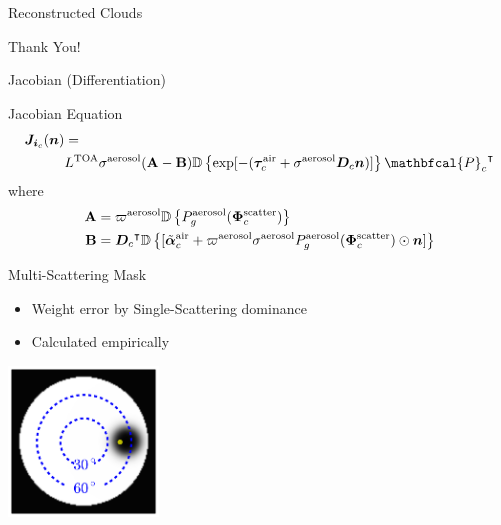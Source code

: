 \documentclass[compress,red,12pt]{beamer}
\newcommand{\vect}[1]{\bm{#1}}
\newcommand{\transpose}[1]{{#1}^\intercal}
\newcommand{\OpCamera}{\mathbfcal{P}}
\newcommand{\OpDiag}[1]{\mathbb{D}\left\{#1\right\}}
\begin{document}

\begin{frame}[label=current]{Reconstructed Clouds}
  \centerline{}
\end{frame}


\begin{frame}{}
  \begin{center}
    {\huge Thank You!}
  \end{center}
\end{frame}


\appendix

\begin{frame}[label=jacobian]{Jacobian (Differentiation)}
  \begin{block}{Jacobian Equation}
    \begin{align*}
      {\bm J}_{{\bm i}_c}({\bm n}) &= \\
      &L^{\rm TOA}{\sigma}^{\rm
        aerosol}({\bf A}-{\bf B}) \OpDiag{\exp[-(\vect{\tau}_c^{\rm air} +
        {\sigma}^{\rm aerosol} {\bm D}_c {\bm n})]}
      \transpose{\OpCamera_c}
    \end{align*}
    where
    \begin{align*}
      {\bf A} &= \varpi^{\rm aerosol}
      \OpDiag{ P_g^{\rm aerosol}(\vect{\Phi}^{\rm scatter}_c)} \\
      {\bf B} &= \transpose{{\bm D}_c}
      \OpDiag{[\tilde{\vect{\alpha}}^{\rm air}_c + \varpi^{\rm
          aerosol}\sigma^{\rm aerosol} P^{\rm aerosol}_g(\vect{\Phi}^{\rm
          scatter}_c) \odot{\bm n}    ]}
    \end{align*}
  \end{block}
  \hfill\hyperlink{gradient}{}
\end{frame}

\begin{frame}[label=mask]{Multi-Scattering Mask}
  \begin{itemize}
  \item Weight error by Single-Scattering dominance
  \item Calculated empirically
  \end{itemize}
  \centerline{\includegraphics[height=4cm]{images/sun_mask.pdf}}
  \hfill\hyperlink{objective<3>}{} 
\end{frame}
\end{document}
